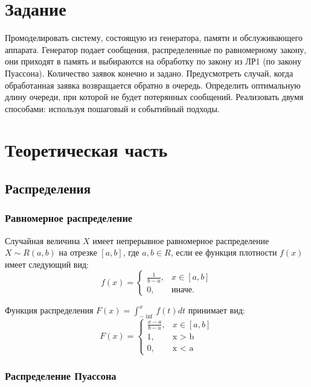 \documentclass[14pt, a4paper]{extarticle}
\begin{document}


\setcounter{page}{2}
\section{Задание}
Промоделировать систему, состоящую из генератора, памяти и обслуживающего аппарата. Генератор подает сообщения, распределенные по равномерному закону, они приходят в память и выбираются на обработку по закону из ЛР1 (по закону Пуассона). Количество заявок конечно и задано. Предусмотреть случай, когда обработанная заявка возвращается обратно в очередь. Определить оптимальную длину очереди, при которой не будет потерянных сообщений. Реализовать двумя способами: используя пошаговый и событийный подходы.

\section{Теоретическая часть}

\subsection{Распределения}
\subsubsection{Равномерное распределение}

Случайная величина $X$ имеет непрерывное равномерное распределение $X \sim R(a, b)$ на отрезке $[a, b]$, где $a, b \in R$, если ее функция плотности $f(x)$ имеет следующий вид:
\begin{equation}
	f(x)=\begin{cases}
		\frac{1}{b - a}, & x \in [a, b] \\
		0, & \text{иначе}.
	\end{cases}
\end{equation}

Функция распределения $F(x) = \int_{-\inf}^{x}f(t)dt$ принимает вид: 
\begin{equation}
	F(x)=\begin{cases}
		\frac{x - a}{b - a}, & x \in [a, b] \\
		1, & \text{x > b} \\ 
		0, & \text{x < a}
	\end{cases}
\end{equation}

\subsubsection{Распределение Пуассона}
\end{document}
